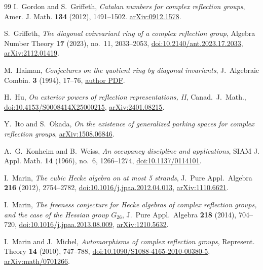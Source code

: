 \documentclass[10pt,a4paper]{amsart}
\theoremstyle{definition}
\begin{document}
\begin{thebibliography}{99}
I.~Gordon and S.~Griffeth,
\emph{Catalan numbers for complex reflection groups},
Amer. J. Math. \textbf{134} (2012), 1491--1502.
\href{https://arxiv.org/abs/0912.1578}{arXiv:0912.1578}.

S.~Griffeth,
\emph{The diagonal coinvariant ring of a complex reflection group},
Algebra Number Theory \textbf{17} (2023), no.~11, 2033--2053,
\href{https://doi.org/10.2140/ant.2023.17.2033}{doi:10.2140/ant.2023.17.2033},
\href{https://arxiv.org/abs/2112.01419}{arXiv:2112.01419}.

M.~Haiman, \emph{Conjectures on the quotient ring by diagonal invariants},
J.~Algebraic Combin. \textbf{3} (1994), 17--76,
\href{https://math.berkeley.edu/~mhaiman/ftp/diagonal/diagonal.pdf}{author PDF}.

H.~Hu, \emph{On exterior powers of reflection representations, II},
Canad.~J.~Math.,
\href{https://doi.org/10.4153/S0008414X25000215}{doi:10.4153/S0008414X25000215},
\href{https://arxiv.org/abs/2401.08215}{arXiv:2401.08215}.

Y.~Ito and S.~Okada,
\emph{On the existence of generalized parking spaces for complex reflection groups},
\href{https://arxiv.org/abs/1508.06846}{arXiv:1508.06846}.

A.~G.~Konheim and B.~Weiss,
\emph{An occupancy discipline and applications},
SIAM J. Appl. Math. \textbf{14} (1966), no.~6, 1266--1274,
\href{https://doi.org/10.1137/0114101}{doi:10.1137/0114101}.

I.~Marin,
\emph{The cubic Hecke algebra on at most 5 strands},
J.~Pure Appl.~Algebra \textbf{216} (2012), 2754--2782,
\href{https://doi.org/10.1016/j.jpaa.2012.04.013}{doi:10.1016/j.jpaa.2012.04.013},
\href{https://arxiv.org/abs/1110.6621}{arXiv:1110.6621}.

I.~Marin,
\emph{The freeness conjecture for Hecke algebras of complex reflection groups,
and the case of the Hessian group $G_{26}$},
J.~Pure Appl.~Algebra \textbf{218} (2014), 704--720,
\href{https://doi.org/10.1016/j.jpaa.2013.08.009}{doi:10.1016/j.jpaa.2013.08.009},
\href{https://arxiv.org/abs/1210.5632}{arXiv:1210.5632}.

I.~Marin and J.~Michel,
\emph{Automorphisms of complex reflection groups},
Represent. Theory \textbf{14} (2010), 747--788,
\href{https://doi.org/10.1090/S1088-4165-2010-00380-5}{doi:10.1090/S1088-4165-2010-00380-5},
\href{https://arxiv.org/abs/math/0701266}{arXiv:math/0701266}.


\end{thebibliography}
\end{document}
